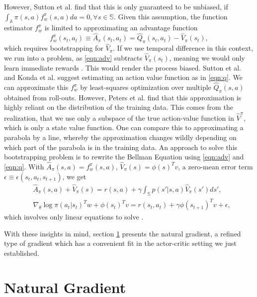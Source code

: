 \documentclass[conference, final]{IEEEtran}
\begin{document}
However, Sutton et al. \cite{1993b} find that this is only guaranteed to be unbiased, if $\int_\mathbb{A}{\pi(s,a)f_w^\pi(s,a)da} = 0, \forall s \in \mathbb{S}$. 
Given this assumption, the function estimator $f_w^\pi$ is limited to approximating an advantage function
\begin{equation}
	f_w^\pi(s_t, a_t) \equiv \hat{A}_{\pi}(s_t, a_t) = \hat{Q}_{\pi}(s_t, a_t) - \hat{V}_{\pi}(s_t),
	\label{eqn:adv}
\end{equation} 
which requires bootstrapping for $\hat{V}_\pi$. 
If we use temporal difference in this context, we run into a problem, as \eqref{eqn:adv} subtracts $\hat{V}_\pi(s_t)$, meaning we would only learn immediate rewards \cite{Peters_IICHR_2003}. 
This would render the process biased. 
Sutton et al. \cite{Sutton:1999:PGM:3009657.3009806} and Konda et al. \cite{NIPS1999_1786} suggest estimating an action value function as in \eqref{eqn:q}. 
We can approximate this $f_w^\pi$ by least-squares optimization over multiple $\hat{Q}_\pi(s,a)$ obtained from roll-outs. 
However, Peters et al. \cite{4863} find that this approximation is highly reliant on the distribution of the training data. 
This comes from the realization, that we use only a subspace of the true action-value function in $\hat{V}^\pi$, which is only a state value function. 
One can compare this to approximating a parabola by a line, whereby the approximation changes wildly depending on which part of the parabola is in the training data. 
An approach to solve this bootstrapping problem is to rewrite the Bellman Equation using \eqref{eqn:adv} and \eqref{eqn:q}.
With $\hat{A}_\pi(s,a) = f_w^\pi(s,a)$, $\hat{V}_\pi(s) = \phi(s)^T v$, a zero-mean error term $\epsilon \equiv \epsilon(s_t,a_t,s_{t+1})$, we get
\begin{align}
  &\hat{A}_\pi(s,a) + \hat{V}_\pi(s) = r(s,a) + \gamma \int_\mathbb{S} p(s'|s,a)\hat{V}_\pi(s')ds', \\
  &\nabla_\theta \log \pi(a_t|s_t)^T w + \phi(s_t)^T v = r(s_t,a_t) + \gamma \phi(s_{t+1})^T v + \epsilon ,
\end{align}
which involves only linear equations to solve \cite{4863}.

With these insights in mind, section \ref{sec:natural} presents the natural gradient, a refined type of gradient which has a convenient fit in the actor-critic setting we just established.

\section{Natural Gradient}
\label{sec:natural}
\end{document}
